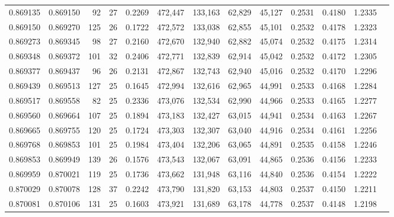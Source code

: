 \begin{tabular}{rrrrrrrrrrrrr}
0.869135 & 0.869150 &    92 &  27 &                                     0.2269 & 472,447 & 133,163 &  62,829 &  45,127 & 0.2531 & 0.4180 & 1.2335 \\
0.869150 & 0.869270 &   125 &  26 &                                     0.1722 & 472,572 & 133,038 &  62,855 &  45,101 & 0.2532 & 0.4178 & 1.2323 \\
0.869273 & 0.869345 &    98 &  27 &                                     0.2160 & 472,670 & 132,940 &  62,882 &  45,074 & 0.2532 & 0.4175 & 1.2314 \\
0.869348 & 0.869372 &   101 &  32 &                                     0.2406 & 472,771 & 132,839 &  62,914 &  45,042 & 0.2532 & 0.4172 & 1.2305 \\
0.869377 & 0.869437 &    96 &  26 &                                     0.2131 & 472,867 & 132,743 &  62,940 &  45,016 & 0.2532 & 0.4170 & 1.2296 \\
0.869439 & 0.869513 &   127 &  25 &                                     0.1645 & 472,994 & 132,616 &  62,965 &  44,991 & 0.2533 & 0.4168 & 1.2284 \\
0.869517 & 0.869558 &    82 &  25 &                                     0.2336 & 473,076 & 132,534 &  62,990 &  44,966 & 0.2533 & 0.4165 & 1.2277 \\
0.869560 & 0.869664 &   107 &  25 &                                     0.1894 & 473,183 & 132,427 &  63,015 &  44,941 & 0.2534 & 0.4163 & 1.2267 \\
0.869665 & 0.869755 &   120 &  25 &                                     0.1724 & 473,303 & 132,307 &  63,040 &  44,916 & 0.2534 & 0.4161 & 1.2256 \\
0.869768 & 0.869853 &   101 &  25 &                                     0.1984 & 473,404 & 132,206 &  63,065 &  44,891 & 0.2535 & 0.4158 & 1.2246 \\
0.869853 & 0.869949 &   139 &  26 &                                     0.1576 & 473,543 & 132,067 &  63,091 &  44,865 & 0.2536 & 0.4156 & 1.2233 \\
0.869959 & 0.870021 &   119 &  25 &                                     0.1736 & 473,662 & 131,948 &  63,116 &  44,840 & 0.2536 & 0.4154 & 1.2222 \\
0.870029 & 0.870078 &   128 &  37 &                                     0.2242 & 473,790 & 131,820 &  63,153 &  44,803 & 0.2537 & 0.4150 & 1.2211 \\
0.870081 & 0.870106 &   131 &  25 &                                     0.1603 & 473,921 & 131,689 &  63,178 &  44,778 & 0.2537 & 0.4148 & 1.2198 \\

\end{tabular}
